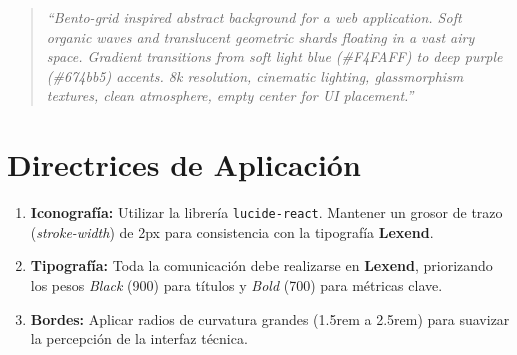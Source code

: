 \documentclass{article}
\begin{document}
\begin{quote}
    \textit{``Bento-grid inspired abstract background for a web application. Soft organic waves and translucent geometric shards floating in a vast airy space. Gradient transitions from soft light blue (\#F4FAFF) to deep purple (\#674bb5) accents. 8k resolution, cinematic lighting, glassmorphism textures, clean atmosphere, empty center for UI placement.''}
\end{quote}

\section{Directrices de Aplicación}
\begin{enumerate}
    \item \textbf{Iconografía:} Utilizar la librería \texttt{lucide-react}. Mantener un grosor de trazo (\textit{stroke-width}) de 2px para consistencia con la tipografía \textbf{Lexend}.
    \item \textbf{Tipografía:} Toda la comunicación debe realizarse en \textbf{Lexend}, priorizando los pesos \textit{Black} (900) para títulos y \textit{Bold} (700) para métricas clave.
    \item \textbf{Bordes:} Aplicar radios de curvatura grandes (1.5rem a 2.5rem) para suavizar la percepción de la interfaz técnica.
\end{enumerate}
\end{document}
